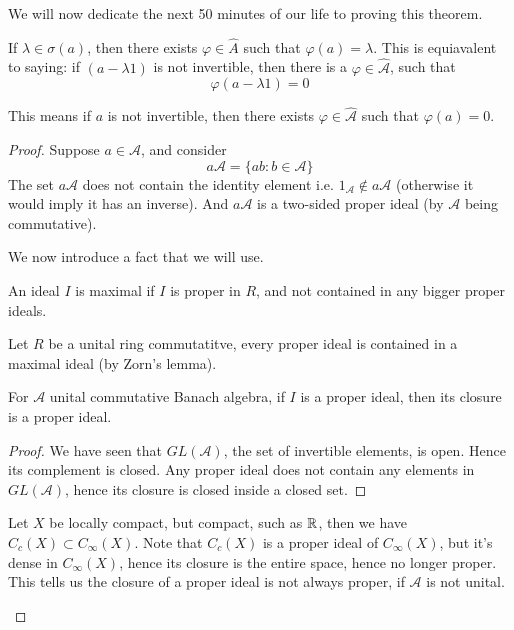 We will now dedicate the next 50 minutes of our life to proving this theorem.
\begin{theorem}
    If $\lambda\in\sigma(a)$, then there exists $\varphi\in\widehat{A}$ such that $\varphi(a)=\lambda$. This is equiavalent to saying: if $(a-\lambda1)$ is not invertible, then there is a $\varphi\in\widehat{\mathcal{A}}$, such that 
    \begin{equation*}
        \varphi(a-\lambda1)=0
    \end{equation*}

    This means if $a$ is not invertible, then there exists $\varphi\in\widehat{\mathcal{A}}$ such that $\varphi(a)=0$.
\end{theorem}
\begin{proof}
    Suppose $a\in\mathcal{A}$, and consider
    \begin{equation*}
        a\mathcal{A}=\{ab: b\in\mathcal{A}\}
    \end{equation*}
    The set $a\mathcal{A}$ does not contain the identity element i.e. $1_\mathcal{A}\not\in a\mathcal{A}$ (otherwise it would imply it has an inverse). And $a\mathcal{A}$ is a two-sided proper ideal (by $\mathcal{A}$ being commutative).

    We now introduce a fact that we will use.
    \begin{definition}
        An ideal $I$ is maximal if $I$ is proper in $R$, and not contained in any bigger proper ideals.
    \end{definition}
        
    \begin{lemma}
        Let $R$ be a unital ring commutatitve, every proper ideal is contained in a maximal ideal (by Zorn's lemma).
    \end{lemma}

    \begin{lemma}
    For $\mathcal{A}$ unital commutative Banach algebra, if $I$ is a proper ideal, then its closure is a proper ideal.
    \end{lemma}
        \begin{proof}
        We have seen that $GL(\mathcal{A})$, the set of invertible elements, is open. Hence its complement is closed. Any proper ideal does not contain any elements in $GL(\mathcal{A})$, hence its closure is closed inside a closed set. 
        \end{proof}
    
    \begin{remark}
        Let $X$ be locally compact, but compact, such as $\mathbb{R}$, then we have $C_c(X)\subset C_\infty(X)$. Note that $C_c(X)$ is a proper ideal of $C_\infty(X)$, but it's dense in $C_\infty(X)$, hence its closure is the entire space, hence no longer proper. This tells us the closure of a proper ideal is not always proper, if $\mathcal{A}$ is not unital.
    \end{remark}


\end{proof}
